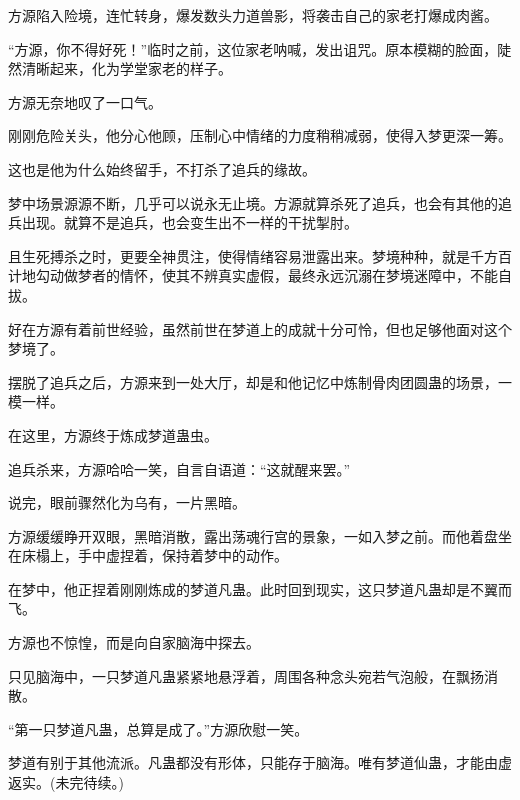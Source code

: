 \begin{this_body}
方源陷入险境，连忙转身，爆发数头力道兽影，将袭击自己的家老打爆成肉酱。

“方源，你不得好死！”临时之前，这位家老呐喊，发出诅咒。原本模糊的脸面，陡然清晰起来，化为学堂家老的样子。

方源无奈地叹了一口气。

刚刚危险关头，他分心他顾，压制心中情绪的力度稍稍减弱，使得入梦更深一筹。

这也是他为什么始终留手，不打杀了追兵的缘故。

梦中场景源源不断，几乎可以说永无止境。方源就算杀死了追兵，也会有其他的追兵出现。就算不是追兵，也会变生出不一样的干扰掣肘。

且生死搏杀之时，更要全神贯注，使得情绪容易泄露出来。梦境种种，就是千方百计地勾动做梦者的情怀，使其不辨真实虚假，最终永远沉溺在梦境迷障中，不能自拔。

好在方源有着前世经验，虽然前世在梦道上的成就十分可怜，但也足够他面对这个梦境了。

摆脱了追兵之后，方源来到一处大厅，却是和他记忆中炼制骨肉团圆蛊的场景，一模一样。

在这里，方源终于炼成梦道蛊虫。

追兵杀来，方源哈哈一笑，自言自语道：“这就醒来罢。”

说完，眼前骤然化为乌有，一片黑暗。

方源缓缓睁开双眼，黑暗消散，露出荡魂行宫的景象，一如入梦之前。而他着盘坐在床榻上，手中虚捏着，保持着梦中的动作。

在梦中，他正捏着刚刚炼成的梦道凡蛊。此时回到现实，这只梦道凡蛊却是不翼而飞。

方源也不惊惶，而是向自家脑海中探去。

只见脑海中，一只梦道凡蛊紧紧地悬浮着，周围各种念头宛若气泡般，在飘扬消散。

“第一只梦道凡蛊，总算是成了。”方源欣慰一笑。

梦道有别于其他流派。凡蛊都没有形体，只能存于脑海。唯有梦道仙蛊，才能由虚返实。(未完待续。)

\end{this_body}

